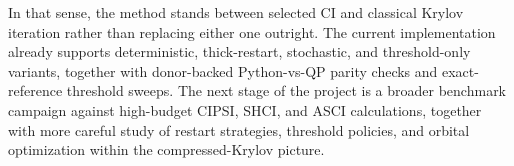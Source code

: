\documentclass[aip,jcp,preprint,longbibliography]{revtex4-2}
\begin{document}
In that sense, the method stands between selected CI and classical Krylov iteration rather than replacing either one outright. The current implementation already supports deterministic, thick-restart, stochastic, and threshold-only variants, together with donor-backed Python-vs-QP parity checks and exact-reference threshold sweeps. The next stage of the project is a broader benchmark campaign against high-budget CIPSI, SHCI, and ASCI calculations, together with more careful study of restart strategies, threshold policies, and orbital optimization within the compressed-Krylov picture.


\end{document}
